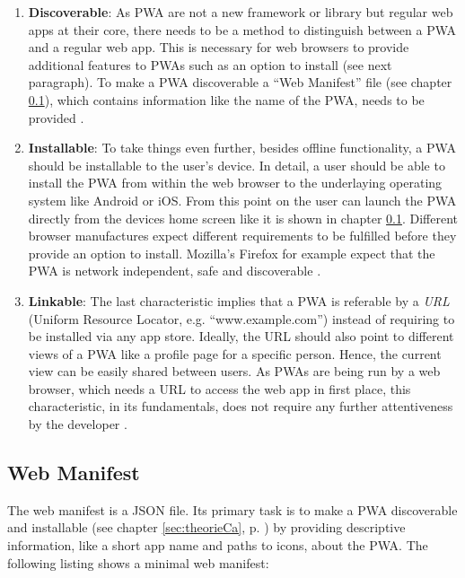 \begin{enumerate}
	\item \textbf{Discoverable}: As  \acs{PWA} are not a new framework or library but regular web apps at their core, there needs to be a method to distinguish between a  \acs{PWA} and a regular web app. This is necessary for web browsers to provide additional features to  \acs{PWA}s such as an option to install (see next paragraph). To make a  \acs{PWA} discoverable a “Web Manifest” file (see chapter \ref{sec:theorieCb}), which contains information like the name of the  \acs{PWA}, needs to be provided \cite[p. 118]{liebelProgressiveWebApps2019}.

	\item \textbf{Installable}: To take things even further, besides offline functionality, a  \acs{PWA} should be installable to the user’s device. In detail, a user should be able to install the  \acs{PWA} from within the web browser to the underlaying operating system like Android or iOS. From this point on the user can launch the  \acs{PWA} directly from the devices home screen like it is shown in chapter \ref{sec:theorieCb}. Different browser manufactures expect different requirements to be fulfilled before they provide an option to install. Mozilla’s Firefox for example expect that the  \acs{PWA} is network independent, safe and discoverable \cite{HowMakePWAs}.

	\item \textbf{Linkable}: The last characteristic implies that a  \acs{PWA} is referable by a \textit{URL} (Uniform Resource Locator, e.g. “www.example.com”) instead of requiring to be installed via any app store. Ideally, the URL should also point to different views of a  \acs{PWA} like a profile page for a specific person. Hence, the current view can be easily shared between users. As  \acs{PWA}s are being run by a web browser, which needs a URL to access the web app in first place, this characteristic, in its fundamentals, does not require any further attentiveness by the developer \cite[pp. 126-127]{liebelProgressiveWebApps2019}.
\end{enumerate}

\subsection{Web Manifest}
\label{sec:theorieCb}

The web manifest is a \acl{JSON} file. Its primary task is to make a  \acs{PWA} discoverable and installable (see chapter \ref{sec:theorieCa}, p. \pageref{sec:theorieCa}) by providing descriptive information, like a short app name and paths to icons, about the  \acs{PWA}. 
The following listing shows a minimal web manifest:

